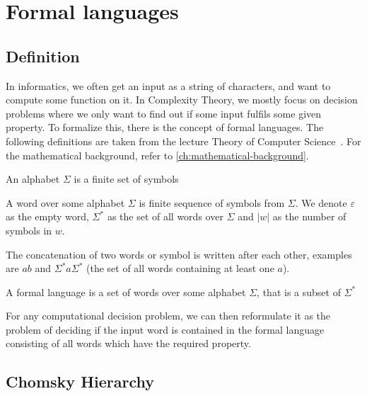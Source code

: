 \chapter{Formal languages}\label{ch:formal-languages}


\section{Definition}\label{sec:definition}

In informatics, we often get an input as a string of characters, and want to compute some function on it.
In Complexity Theory, we mostly focus on decision problems where we only want to find out if some input fulfils some given property.
To formalize this, there is the concept of formal languages.
The following definitions are taken from the lecture Theory of Computer Science~\cite{theory-cs}.
For the mathematical background, refer to \autoref{ch:mathematical-background}.

\begin{define}[Alphabet]
    An alphabet $\Sigma$ is a finite set of symbols
\end{define}

\begin{define}[Word]
    A word over some alphabet $\Sigma$ is finite sequence of symbols from $\Sigma$.
    We denote $\varepsilon$ as the empty word, $\Sigma^*$ as the set of all words over $\Sigma$ and $|w|$ as the number of symbols in $w$.
\end{define}

The concatenation of two words or symbol is written after each other, examples are $ab$ and $\Sigma^*a\Sigma^*$ (the set of all words containing at least one $a$).

\begin{define}
    A formal language is a set of words over some alphabet $\Sigma$, that is a subset of $\Sigma^*$
\end{define}

For any computational decision problem, we can then reformulate it as the problem of deciding if the input word is contained in the formal language consisting of all words which have the required property.


\section{Chomsky Hierarchy}\label{sec:chromsky-hierarchy}

